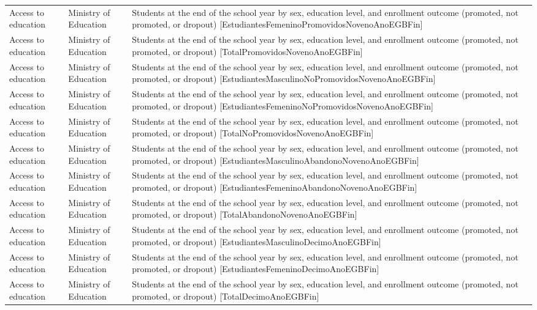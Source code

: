 \documentclass[10pt,a4paper]{article}
\begin{document}
\begin{longtable}{@{}>{\raggedright\arraybackslash}p{3.5cm}>{\raggedright\arraybackslash}p{5.6cm}>{\raggedright\arraybackslash}p{\dimexpr\textwidth-9.1cm-4\tabcolsep\relax}@{}}
Access to education & Ministry of Education & Students at the end of the school year by sex, education level, and enrollment outcome (promoted, not promoted, or dropout) [EstudiantesFemeninoPromovidosNovenoAnoEGBFin]\\
Access to education & Ministry of Education & Students at the end of the school year by sex, education level, and enrollment outcome (promoted, not promoted, or dropout) [TotalPromovidosNovenoAnoEGBFin]\\
Access to education & Ministry of Education & Students at the end of the school year by sex, education level, and enrollment outcome (promoted, not promoted, or dropout) [EstudiantesMasculinoNoPromovidosNovenoAnoEGBFin]\\
Access to education & Ministry of Education & Students at the end of the school year by sex, education level, and enrollment outcome (promoted, not promoted, or dropout) [EstudiantesFemeninoNoPromovidosNovenoAnoEGBFin]\\
Access to education & Ministry of Education & Students at the end of the school year by sex, education level, and enrollment outcome (promoted, not promoted, or dropout) [TotalNoPromovidosNovenoAnoEGBFin]\\
Access to education & Ministry of Education & Students at the end of the school year by sex, education level, and enrollment outcome (promoted, not promoted, or dropout) [EstudiantesMasculinoAbandonoNovenoAnoEGBFin]\\
Access to education & Ministry of Education & Students at the end of the school year by sex, education level, and enrollment outcome (promoted, not promoted, or dropout) [EstudiantesFemeninoAbandonoNovenoAnoEGBFin]\\
Access to education & Ministry of Education & Students at the end of the school year by sex, education level, and enrollment outcome (promoted, not promoted, or dropout) [TotalAbandonoNovenoAnoEGBFin]\\
Access to education & Ministry of Education & Students at the end of the school year by sex, education level, and enrollment outcome (promoted, not promoted, or dropout) [EstudiantesMasculinoDecimoAnoEGBFin]\\
Access to education & Ministry of Education & Students at the end of the school year by sex, education level, and enrollment outcome (promoted, not promoted, or dropout) [EstudiantesFemeninoDecimoAnoEGBFin]\\
Access to education & Ministry of Education & Students at the end of the school year by sex, education level, and enrollment outcome (promoted, not promoted, or dropout) [TotalDecimoAnoEGBFin]\\

\end{longtable}
\end{document}

